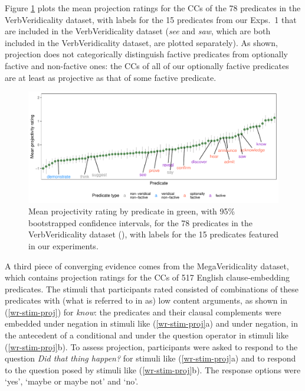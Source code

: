 \documentclass[11pt,fleqn]{article}
\newcommand{\6}{\mbox{$[\hspace*{-.6mm}[$}}
\newcommand{\9}{\mbox{$]\hspace*{-.6mm}]$}}
\begin{document}
Figure \ref{f-vv-projectivity} plots the mean projection ratings for the CCs of the 78 predicates in the VerbVeridicality dataset, with labels for the 15 predicates from our Exps.~1 that are included in the VerbVeridicality dataset ({\em see} and {\em saw}, which are both included in the VerbVeridicality dataset, are plotted separately). As shown, projection does not categorically distinguish factive predicates from optionally factive and non-factive ones: the CCs of all of our optionally factive predicates are at least as projective as that of some factive predicate. 

\begin{figure}[H]
\centering
\includegraphics[width=.77\paperwidth]{../../VerbVeridicality-analysis/graphs/means-projection-by-predicate}

\caption{Mean projectivity rating by predicate in green, with 95\% bootstrapped confidence intervals, for the 78 predicates in the VerbVeridicality dataset (\citealt{ross-pavlick2019}), with labels for the 15 predicates featured in our experiments.}
\label{f-vv-projectivity}
\end{figure}



A third piece of converging evidence comes from the MegaVeridicality dataset, which contains projection ratings for the CCs of 517 English clause-embedding predicates. The stimuli that participants rated consisted of combinations of these predicates with (what is referred to in \citealt{white-rawlins-nels2018}  as) low content arguments, as shown in (\ref{wr-stim-proj}) for {\em know}: the predicates and their clausal complements were embedded under negation in stimuli like (\ref{wr-stim-proj}a) and under negation, in the antecedent of a conditional and under the question operator in stimuli like (\ref{wr-stim-proj}b). To assess projection, participants were asked to respond to the question {\em Did that thing happen?} for stimuli like (\ref{wr-stim-proj}a) and to respond to the question posed by stimuli like (\ref{wr-stim-proj}b). The response options were `yes', `maybe or maybe not' and `no'. 
\end{document}
